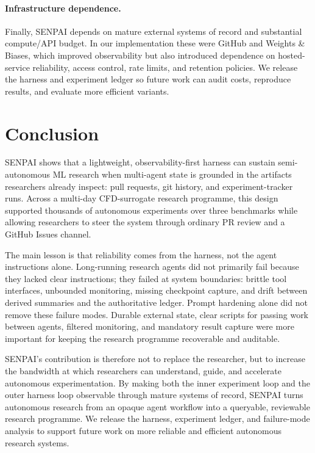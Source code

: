 \documentclass{article}
\begin{document}
\paragraph{Infrastructure dependence.}
Finally, SENPAI depends on mature external systems of record and substantial compute/API budget. In our implementation these were GitHub and Weights \& Biases, which improved observability but also introduced dependence on hosted-service reliability, access control, rate limits, and retention policies. We release the harness and experiment ledger so future work can audit costs, reproduce results, and evaluate more efficient variants.

\section{Conclusion}

SENPAI shows that a lightweight, observability-first harness can sustain semi-autonomous ML research when multi-agent state is grounded in the artifacts researchers already inspect: pull requests, git history, and experiment-tracker runs. Across a multi-day CFD-surrogate research programme, this design supported thousands of autonomous experiments over three benchmarks while allowing researchers to steer the system through ordinary PR review and a GitHub Issues channel.

The main lesson is that reliability comes from the harness, not the agent instructions alone. Long-running research agents did not primarily fail because they lacked clear instructions; they failed at system boundaries: brittle tool interfaces, unbounded monitoring, missing checkpoint capture, and drift between derived summaries and the authoritative ledger. Prompt hardening alone did not remove these failure modes. Durable external state, clear scripts for passing work between agents, filtered monitoring, and mandatory result capture were more important for keeping the research programme recoverable and auditable.

SENPAI's contribution is therefore not to replace the researcher, but to increase the bandwidth at which researchers can understand, guide, and accelerate autonomous experimentation. By making both the inner experiment loop and the outer harness loop observable through mature systems of record, SENPAI turns autonomous research from an opaque agent workflow into a queryable, reviewable research programme. We release the harness, experiment ledger, and failure-mode analysis to support future work on more reliable and efficient autonomous research systems.
\end{document}
